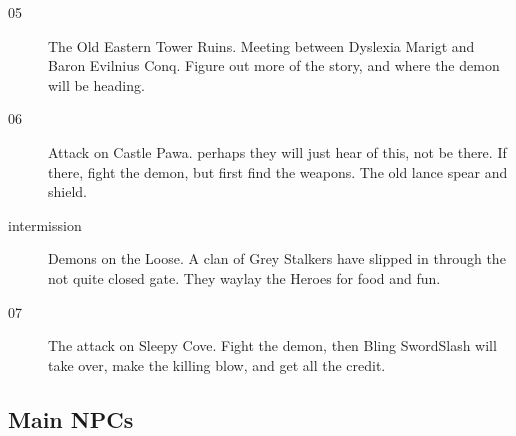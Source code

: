 \documentclass[11pt, twoside, titlepage, a4paper]{report}
\begin{document}
\begin{description}
\item[05] The Old Eastern Tower Ruins. Meeting between Dyslexia Marigt and Baron Evilnius Conq. Figure out more of the story, and where the demon will be heading.


\item[06] Attack on Castle Pawa. perhaps they will just hear of this, not be there. If there, fight the demon, but first find the weapons. The old lance spear and shield.


\item[intermission] Demons on the Loose. A clan of Grey Stalkers have slipped in through the not quite closed gate. They waylay the Heroes for food and fun.


\item[07] The attack on Sleepy Cove. Fight the demon, then Bling SwordSlash will take over, make the killing blow, and get all the credit.

\end{description}



\subsection*{Main NPCs}
\end{document}
